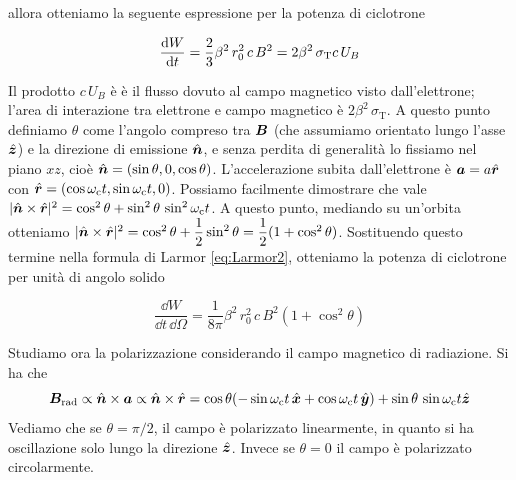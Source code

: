 allora otteniamo la seguente espressione per la potenza di ciclotrone
\begin{EQ}
\begin{equation}
\dfrac{\mathrm{d} {W}}{\mathrm{d} {t}} = \dfrac{2}{3}\beta^2\, r_0^2 \, c\, B^2 = 2 \beta^2 \, \sigma_\mathrm{T} c \, U_B \label{eq:Ciclotrone2}
\end{equation}
\end{EQ}
Il prodotto $c \, U_B$ è è il flusso dovuto al campo magnetico visto dall'elettrone; l'area di interazione tra elettrone e campo magnetico è $2 \beta^2 \, \sigma_\mathrm{T}$.
A questo punto definiamo $\theta$ come l'angolo compreso tra $\V{B}$ (che assumiamo orientato lungo l'asse $\vers{z}$) e la direzione di emissione $\vers{n}$, e senza perdita di generalità lo fissiamo nel piano $xz$, cioè $\vers{n}=(\sin\theta, 0, \cos\theta)$. L'accelerazione subita dall'elettrone è $\V{a} = a\vers{r}$ con $\vers{r} = (\cos\omega_\mathrm{c}t, \sin\omega_\mathrm{c}t, 0)$. Possiamo facilmente dimostrare che vale $|\vett{\hat{n}}{\hat{r}}|^2 = \cos^2\theta + \sin^2\theta \, \sin^2\omega_\mathrm{c}t$. A questo punto, mediando su un'orbita otteniamo $|\vett{\hat{n}}{\hat{r}}|^2 = \cos^2\theta + \inv{2}\sin^2\theta = \inv{2}(1+\cos^2\theta)$. Sostituendo questo termine nella formula di Larmor \ref{eq:Larmor2}, otteniamo la potenza di ciclotrone per unità di angolo solido 
\begin{EQ}
\begin{equation}
\dfrac{\dd W}{\dd t \, \dd \Omega}= \dfrac{1}{8\pi}\beta^2\, r_0^2 \, c\, B^2(1+\cos^2\theta) \label{eq:Ciclotrone1}
\end{equation}
\end{EQ}
Studiamo ora la polarizzazione considerando il campo magnetico di radiazione. Si ha che
\begin{equation}
\V{B}_\mathrm{rad} \propto \vett{\hat{n}}{a} \propto \vett{\hat{n}}{\hat{r}} = \cos\theta (-\sin\omega_\mathrm{c}t \, \vers{x} + \cos\omega_\mathrm{c}t \, \vers{y}) + \sin\theta \, \sin\omega_\mathrm{c}t \vers{z}
\end{equation}
Vediamo che se $\theta=\pi/2$, il campo è polarizzato linearmente, in quanto si ha oscillazione solo lungo la direzione $\vers{z}$. Invece se $\theta=0$ il campo è polarizzato circolarmente.

